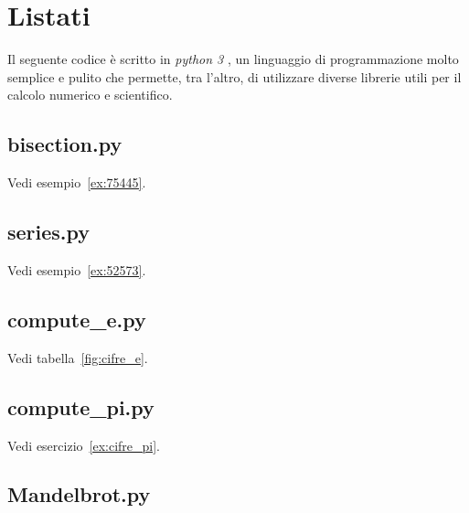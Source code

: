 \chapter{Listati}

Il seguente codice è scritto in \emph{python 3}%
,
un linguaggio di programmazione
molto semplice e pulito che permette, tra l'altro, di utilizzare diverse librerie utili per il calcolo numerico e scientifico.


\section{bisection.py}

Vedi esempio~\ref{ex:75445}.
\label{code:bisection}


\section{series.py}

Vedi esempio~\ref{ex:52573}.
\label{code:series}


\section{compute\_e.py}

Vedi tabella~\ref{fig:cifre_e}.
\label{code:compute_e}


\section{compute\_pi.py}

Vedi esercizio~\ref{ex:cifre_pi}.
\label{code:compute_pi}


\section{Mandelbrot.py}

